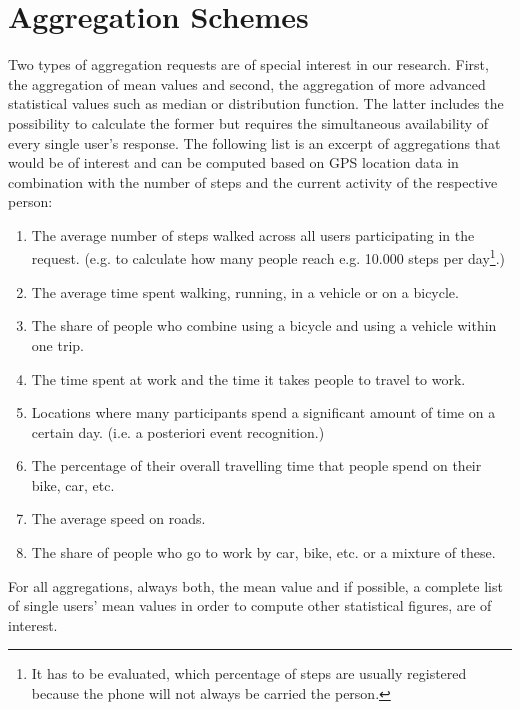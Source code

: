  \section{Aggregation Schemes}\label{aggregation-schemes}
 Two types of aggregation requests are of special interest in our research. First, the aggregation of mean values and second, the aggregation of more advanced statistical values such as median or distribution function. The latter includes the possibility to calculate the former but requires the simultaneous availability of every single user's response. 
 The following list is an excerpt of aggregations that would be of interest and can be computed based on GPS location data in combination with the number of steps and the current activity of the respective person:
 \begin{enumerate}
 	\item The average number of steps walked across all users participating in the request. (e.g. to calculate how many people reach e.g. 10.000 steps per day\footnote{It has to be evaluated, which percentage of steps are usually registered because the phone will not always be carried the person.}.)
	\item The average time spent walking, running, in a vehicle or on a bicycle.
	\item The share of people who combine using a bicycle and using a vehicle within one trip.
	\item The time spent at work and the time it takes people to travel to work.
	\item Locations where many participants spend a significant amount of time on a certain day. (i.e. a posteriori event recognition.)
	\item The percentage of their overall travelling time that people spend on their bike, car, etc.
	\item The average speed on roads.
	\item The share of people who go to work by car, bike, etc. or a mixture of these.
 \end{enumerate}
 For all aggregations, always both, the mean value and if possible, a complete list of single users' mean values in order to compute other statistical figures, are of interest.

